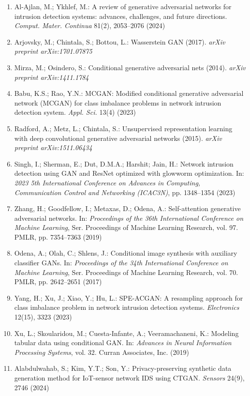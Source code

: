 \documentclass[a4paper]{article}
\begin{document}
\begin{enumerate}[leftmargin=1.2cm, itemsep=1pt, parsep=0pt]
    \item Al-Ajlan, M.; Ykhlef, M.: A review of generative adversarial networks for intrusion detection systems: advances, challenges, and future directions. \textit{Comput. Mater. Continua} 81(2), 2053--2076 (2024)
    \item Arjovsky, M.; Chintala, S.; Bottou, L.: Wasserstein GAN (2017). \textit{arXiv preprint arXiv:1701.07875}
    \item Mirza, M.; Osindero, S.: Conditional generative adversarial nets (2014). \textit{arXiv preprint arXiv:1411.1784}
    \item Babu, K.S.; Rao, Y.N.: MCGAN: Modified conditional generative adversarial network (MCGAN) for class imbalance problems in network intrusion detection system. \textit{Appl. Sci.} 13(4) (2023)
    \item Radford, A.; Metz, L.; Chintala, S.: Unsupervised representation learning with deep convolutional generative adversarial networks (2015). \textit{arXiv preprint arXiv:1511.06434}
    \item Singh, I.; Sherman, E.; Dut, D.M.A.; Harshit; Jain, H.: Network intrusion detection using GAN and ResNet optimized with glowworm optimization. In: \textit{2023 5th International Conference on Advances in Computing, Communication Control and Networking (ICAC3N)}, pp. 1348--1354 (2023)
    \item Zhang, H.; Goodfellow, I.; Metaxas, D.; Odena, A.: Self-attention generative adversarial networks. In: \textit{Proceedings of the 36th International Conference on Machine Learning}, Ser. Proceedings of Machine Learning Research, vol. 97. PMLR, pp. 7354--7363 (2019)
    \item Odena, A.; Olah, C.; Shlens, J.: Conditional image synthesis with auxiliary classifier GANs. In: \textit{Proceedings of the 34th International Conference on Machine Learning}, Ser. Proceedings of Machine Learning Research, vol. 70. PMLR, pp. 2642--2651 (2017)
    \item Yang, H.; Xu, J.; Xiao, Y.; Hu, L.: SPE-ACGAN: A resampling approach for class imbalance problem in network intrusion detection systems. \textit{Electronics} 12(15), 3323 (2023)
    \item Xu, L.; Skoularidou, M.; Cuesta-Infante, A.; Veeramachaneni, K.: Modeling tabular data using conditional GAN. In: \textit{Advances in Neural Information Processing Systems}, vol. 32. Curran Associates, Inc. (2019)
    \item Alabdulwahab, S.; Kim, Y.T.; Son, Y.: Privacy-preserving synthetic data generation method for IoT-sensor network IDS using CTGAN. \textit{Sensors} 24(9), 2746 (2024)

\end{enumerate}
\end{document}
